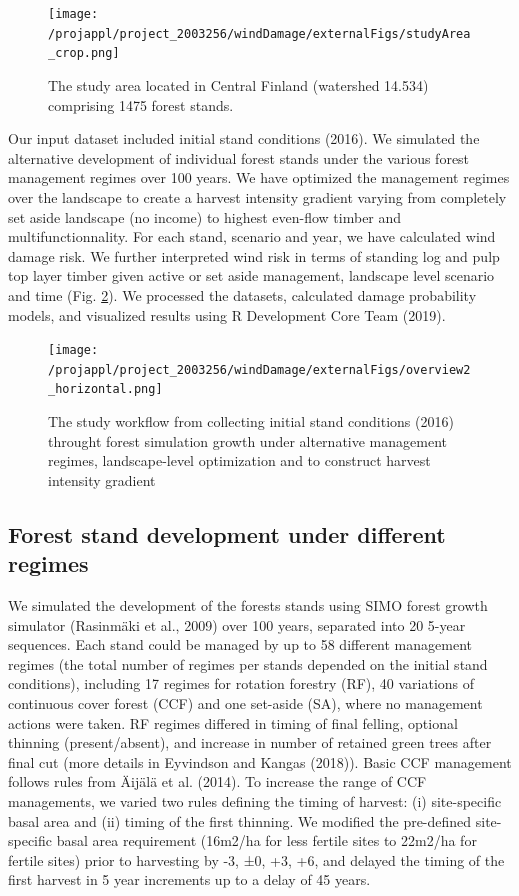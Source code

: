 \documentclass[]{elsarticle} %
\begin{document}
\begin{figure}
\centering
\texttt{[image: /projappl/project\_2003256/windDamage/externalFigs/studyArea\_crop.png]}
\caption{The study area located in Central Finland (watershed 14.534) comprising 1475 forest stands.\label{study_area}}
\end{figure}

Our input dataset included initial stand conditions (2016). We simulated the alternative development of individual forest stands under the various forest management regimes over 100 years. We have optimized the management regimes over the landscape to create a harvest intensity gradient varying from completely set aside landscape (no income) to highest even-flow timber and multifunctionnality. For each stand, scenario and year, we have calculated wind damage risk. We further interpreted wind risk in terms of standing log and pulp top layer timber given active or set aside management, landscape level scenario and time (Fig. \ref{workflow}). We processed the datasets, calculated damage probability models, and visualized results using R Development Core Team (2019).

\begin{figure}
\centering
\texttt{[image: /projappl/project\_2003256/windDamage/externalFigs/overview2\_horizontal.png]}
\caption{The study workflow from collecting initial stand conditions (2016) throught forest simulation growth under alternative management regimes, landscape-level optimization and to construct harvest intensity gradient \label{workflow}}
\end{figure}

\hypertarget{forest-stand-development-under-different-regimes}{%
\subsection{Forest stand development under different regimes}\label{forest-stand-development-under-different-regimes}}

We simulated the development of the forests stands using SIMO forest growth simulator (Rasinmäki et al., 2009) over 100 years, separated into 20 5-year sequences. Each stand could be managed by up to 58 different management regimes (the total number of regimes per stands depended on the initial stand conditions), including 17 regimes for rotation forestry (RF), 40 variations of continuous cover forest (CCF) and one set-aside (SA), where no management actions were taken. RF regimes differed in timing of final felling, optional thinning (present/absent), and increase in number of retained green trees after final cut (more details in Eyvindson and Kangas (2018)). Basic CCF management follows rules from Äijälä et al. (2014). To increase the range of CCF managements, we varied two rules defining the timing of harvest: (i) site-specific basal area and (ii) timing of the first thinning. We modified the pre-defined site-specific basal area requirement (16m2/ha for less fertile sites to 22m2/ha for fertile sites) prior to harvesting by -3, ±0, +3, +6, and delayed the timing of the first harvest in 5 year increments up to a delay of 45 years.
\end{document}

